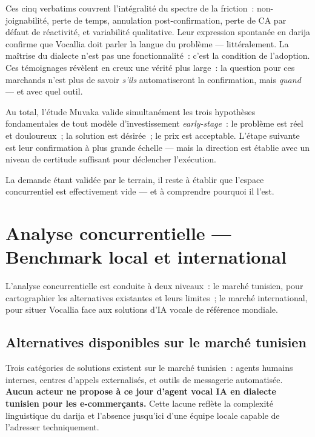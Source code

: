 Ces cinq verbatims couvrent l'intégralité du spectre de la friction~: non-joignabilité, perte de temps, annulation post-confirmation, perte de CA par défaut de réactivité, et variabilité qualitative. Leur expression spontanée en darija confirme que Vocallia doit parler la langue du problème --- littéralement. La maîtrise du dialecte n'est pas une fonctionnalité~: c'est la condition de l'adoption. Ces témoignages révèlent en creux une vérité plus large~: la question pour ces marchands n'est plus de savoir \emph{s'ils} automatiseront la confirmation, mais \emph{quand} --- et avec quel outil.

Au total, l'étude Muvaka valide simultanément les trois hypothèses fondamentales de tout modèle d'investissement \emph{early-stage}~: le problème est réel et douloureux~; la solution est désirée~; le prix est acceptable. L'étape suivante est leur confirmation à plus grande échelle --- mais la direction est établie avec un niveau de certitude suffisant pour déclencher l'exécution.

\medskip
La demande étant validée par le terrain, il reste à établir que l'espace concurrentiel est effectivement vide --- et à comprendre pourquoi il l'est.

\section{Analyse concurrentielle --- Benchmark local et international}
\label{section2.5}

L'analyse concurrentielle est conduite à deux niveaux~: le marché tunisien, pour cartographier les alternatives existantes et leurs limites~; le marché international, pour situer Vocallia face aux solutions d'IA vocale de référence mondiale.

\subsection{Alternatives disponibles sur le marché tunisien}
\label{section2.5.1}

Trois catégories de solutions existent sur le marché tunisien~: agents humains internes, centres d'appels externalisés, et outils de messagerie automatisée. \textbf{Aucun acteur ne propose à ce jour d'agent vocal IA en dialecte tunisien pour les e-commerçants.} Cette lacune reflète la complexité linguistique du darija et l'absence jusqu'ici d'une équipe locale capable de l'adresser techniquement.

